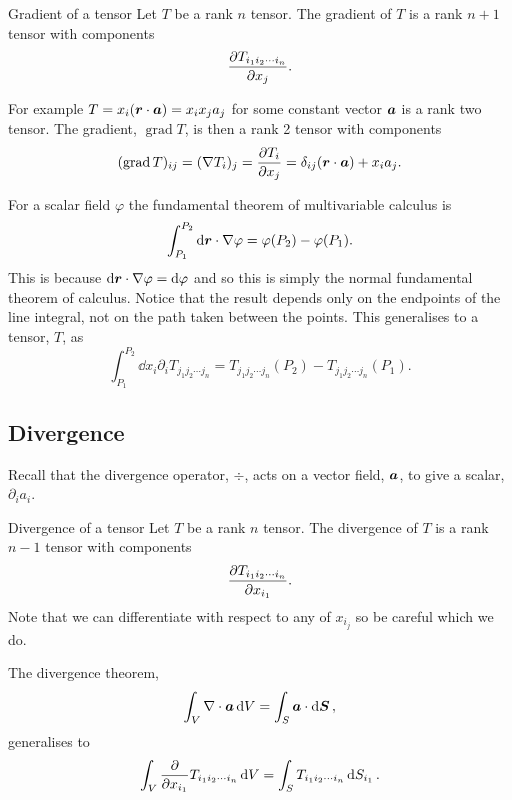 \documentclass[a4paper]{article}
\newcommand{\nindices}[2]{{ {#1}_1 {#1}_2 \dotsm {#1}_{#2} }}
\DeclareMathOperator{\GRAD}{grad}
\begin{document}
    \begin{definition}{Gradient of a tensor}{}
        Let \(T\) be a rank \(n\) tensor.
        The gradient of \(T\) is a rank \(n + 1\) tensor with components
        \[\pdv{T_{\nindices{i}{n}}}{x_j}.\]
    \end{definition}
    For example \(T = x_i(\bm{r}\cdot\bm{a}) = x_ix_ja_j\) for some constant vector \(\bm{a}\) is a rank two tensor.
    The gradient, \(\GRAD T\), is then a rank 2 tensor with components
    \[(\GRAD T)_{ij} = (\grad T_i)_j = \pdv{T_i}{x_j} = \delta_{ij}(\vv{r}\cdot\vv{a}) + x_ia_j.\]
    
    For a scalar field \(\varphi\) the fundamental theorem of multivariable calculus is
    \[\int_{P_1}^{P_2} \dd{\bm{r}}\cdot \nabla\varphi = \varphi(P_2) - \varphi(P_1).\]
    This is because \(\dd{\bm{r}}\cdot\nabla\varphi = \dd{\varphi}\) and so this is simply the normal fundamental theorem of calculus.
    Notice that the result depends only on the endpoints of the line integral, not on the path taken between the points.
    This generalises to a tensor, \(T\), as
    \[\int_{P_1}^{P_2} \dd{x_i} \partial_i T_{\nindices{j}{n}} = T_{\nindices{j}{n}}(P_2) - T_{\nindices{j}{n}}(P_1).\]
    
    \subsection{Divergence}
    Recall that the divergence operator, \(\div\), acts on a vector field, \(\bm{a}\), to give a scalar, \(\partial_ia_i\).
    \begin{definition}{Divergence of a tensor}{}
        Let \(T\) be a rank \(n\) tensor.
        The divergence of \(T\) is a rank \(n - 1\) tensor with components
        \[\pdv{T_{\nindices{i}{n}}}{x_{i_1}}.\]
        Note that we can differentiate with respect to any of \(x_{i_j}\) so be careful which we do.
    \end{definition}
    The divergence theorem,
    \[\int_V\nabla\cdot\bm{a} \dd{V} = \int_S \bm{a}\cdot\dd{\bm{S}},\]
    generalises to
    \[\int_V \pdv{x_{i_1}}T_{\nindices{i}{n}} \dd{V} = \int_S T_{\nindices{i}{n}}\dd{S_{i_1}}.\]
    
\end{document}
